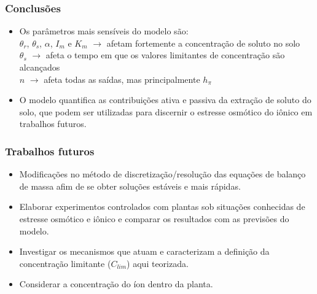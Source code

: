 \begin{frame}
\frametitle{Conclusões}
\begin{itemize}
  \item Os parâmetros mais sensíveis do modelo são: \\
    $\theta_r$, $\theta_s$, $\alpha$, $I_m$ e $K_m$ $\rightarrow$ afetam fortemente a concentração de soluto no solo\\
    $\theta_s$ $\rightarrow$ afeta o tempo em que os valores limitantes de concentração são alcançados\\
    $n$ $\rightarrow$ afeta todas as saídas, mas principalmente $h_\pi$

  \item O modelo quantifica as contribuições ativa e passiva da extração de soluto do solo, que podem ser utilizadas para discernir o estresse osmótico do iônico em trabalhos futuros.
        


\end{itemize}
\end{frame}

\begin{frame}\frametitle{Trabalhos futuros}
  \begin{itemize}
    \item Modificações no método de discretização/resolução das equações de balanço de massa afim de se obter soluções estáveis e mais rápidas.
    \item Elaborar experimentos controlados com plantas sob situações conhecidas de estresse osmótico e iônico e comparar os resultados com as previsões do modelo. 
    \item Investigar os mecanismos que atuam e caracterizam a definição da concentração limitante ($C_{lim}$) aqui teorizada.
    \item Considerar a concentração do íon dentro da planta.
  \end{itemize}

\end{frame}
